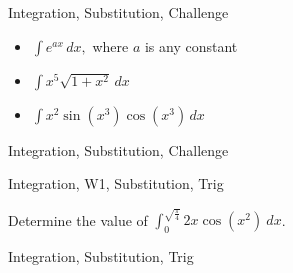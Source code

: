 \begin{tagblock}{Integration, Substitution, Challenge}
\begin{question}

\begin{itemize}
\item$\displaystyle \int e^{ax} \, dx,$  where $a$ is any constant
\item $\displaystyle \int x^5 \sqrt{1+x^2} \, dx$ 
\item $\displaystyle \int x^2 \sin(x^3) \cos(x^3) \, dx$ 
\end{itemize} 



	
	
\begin{tags}
	  Integration, Substitution, Challenge
\end{tags}
	
\begin{diary}
	   
\end{diary}
	
\begin{solution}
	   
	    \end{enumerate}
\end{solution}
	
\end{question}

\end{tagblock}

\begin{tagblock}{Integration, W1, Substitution, Trig}
\begin{question}
	Determine the value of $\displaystyle\int_0^{\sqrt{\frac {\pi} 4}} 2x\cos(x^2) \ dx$.
	
	
\begin{tags}
	    Integration, Substitution, Trig
\end{tags}
	
\begin{diary}
	   
\end{diary}
	
\begin{solution}
	   
	    \end{enumerate}
\end{solution}
	
\end{question}

\end{tagblock}

